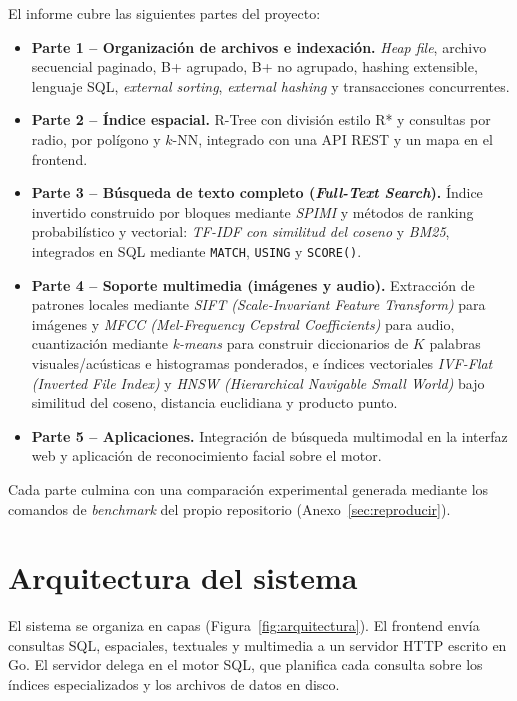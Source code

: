 \documentclass[11pt,a4paper]{article}
\begin{document}
El informe cubre las siguientes partes del proyecto:

\begin{itemize}
  \item \textbf{Parte 1 -- Organización de archivos e indexación.} \emph{Heap file}, archivo secuencial paginado, B+ agrupado, B+ no agrupado, hashing extensible, lenguaje SQL, \emph{external sorting}, \emph{external hashing} y transacciones concurrentes.
  \item \textbf{Parte 2 -- Índice espacial.} R-Tree con división estilo R* y consultas por radio, por polígono y $k$-NN, integrado con una API REST y un mapa en el frontend.
  \item \textbf{Parte 3 -- Búsqueda de texto completo (\emph{Full-Text Search}).} Índice invertido construido por bloques mediante \emph{SPIMI} y métodos de ranking probabilístico y vectorial: \emph{TF-IDF con similitud del coseno} y \emph{BM25}, integrados en SQL mediante \texttt{MATCH}, \texttt{USING} y \texttt{SCORE()}.
  \item \textbf{Parte 4 -- Soporte multimedia (imágenes y audio).} Extracción de patrones locales mediante \emph{SIFT (Scale-Invariant Feature Transform)} para imágenes y \emph{MFCC (Mel-Frequency Cepstral Coefficients)} para audio, cuantización mediante \emph{k-means} para construir diccionarios de $K$ palabras visuales/acústicas e histogramas ponderados, e índices vectoriales \emph{IVF-Flat (Inverted File Index)} y \emph{HNSW (Hierarchical Navigable Small World)} bajo similitud del coseno, distancia euclidiana y producto punto.
  \item \textbf{Parte 5 -- Aplicaciones.} Integración de búsqueda multimodal en la interfaz web y aplicación de reconocimiento facial sobre el motor.
\end{itemize}

Cada parte culmina con una comparación experimental generada mediante los comandos de \emph{benchmark} del propio repositorio (Anexo~\ref{sec:reproducir}).

\section{Arquitectura del sistema}

El sistema se organiza en capas (Figura~\ref{fig:arquitectura}). El frontend envía consultas SQL, espaciales, textuales y multimedia a un servidor HTTP escrito en Go. El servidor delega en el motor SQL, que planifica cada consulta sobre los índices especializados y los archivos de datos en disco.
\end{document}
